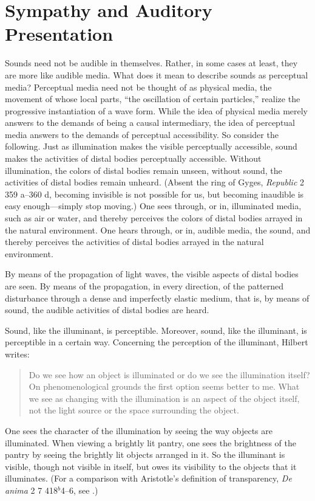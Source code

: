
\section{Sympathy and Auditory Presentation} %
\label{sec:sympathy_and_auditory_presentation}

Sounds need not be audible in themselves. Rather, in some cases at least, they are more like audible media. What does it mean to describe sounds as perceptual media? Perceptual media need not be thought of as physical media, the movement of whose local parts, ``the oscillation of certain particles,'' realize the progressive instantiation of a wave form. While the idea of physical media merely answers to the demands of being a causal intermediary, the idea of perceptual media answers to the demands of perceptual accessibility. So consider the following. Just as illumination makes the visible perceptually accessible, sound makes the activities of distal bodies perceptually accessible. Without illumination, the colors of distal bodies remain unseen, without sound, the activities of distal bodies remain unheard. (Absent the ring of Gyges, \emph{Republic} 2 359 a--360 d, becoming invisible is not possible for us, but becoming inaudible is easy enough---simply stop moving.) One sees through, or in, illuminated media, such as air or water, and thereby perceives the colors of distal bodies arrayed in the natural environment. One hears through, or in, audible media, the sound, and thereby perceives the activities of distal bodies arrayed in the natural environment.

By means of the propagation of light waves, the visible aspects of distal bodies are seen. By means of the propagation, in every direction, of the patterned disturbance through a dense and imperfectly elastic medium, that is, by means of sound, the audible activities of distal bodies are heard.

Sound, like the illuminant, is perceptible. Moreover, sound, like the illuminant, is perceptible in a certain way. Concerning the perception of the illuminant, Hilbert writes:
\begin{quote}
	Do we see how an object is illuminated or do we see the illumination itself? On phenomenological grounds the first option seems better to me. What we see as changing with the illumination is an aspect of the object itself, not the light source or the space surrounding the object. \citep[150--151]{Hilbert:2007qy}
\end{quote}
One sees the character of the illumination by seeing the way objects are illuminated. When viewing a brightly lit pantry, one sees the brightness of the pantry by seeing the brightly lit objects arranged in it. So the illuminant is visible, though not visible in itself, but owes its visibility to the objects that it illuminates. (For a comparison with Aristotle's definition of transparency, \emph{De anima} 2 7 418\( ^{b} \)4--6, see \citealt[41--42]{Kalderon:2015fr}.)

